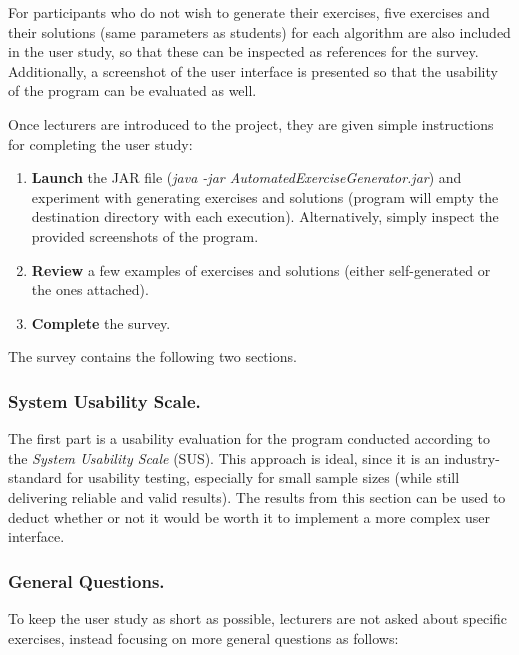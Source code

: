 \documentclass{l4proj}
\begin{document}
For participants who do not wish to generate their exercises, five exercises and their solutions (same parameters as students) for each algorithm are also included in the user study, so that these can be inspected as references for the survey. Additionally, a screenshot of the user interface is presented so that the usability of the program can be evaluated as well.

Once lecturers are introduced to the project, they are given simple instructions for completing the user study:
\begin{enumerate}
	\item
	\textbf{Launch} the JAR file (\emph{java -jar AutomatedExerciseGenerator.jar}) and experiment with generating exercises and solutions (program will empty the destination directory with each execution). Alternatively, simply inspect the provided screenshots of the program.
	\item
	\textbf{Review} a few examples of exercises and solutions (either self-generated or the ones attached).
	\item
	\textbf{Complete} the survey.
\end{enumerate}

The survey contains the following two sections.

\subsubsection{System Usability Scale.}

The first part is a usability evaluation for the program conducted according to the \emph{System Usability Scale} (SUS). This approach is ideal, since it is an industry-standard for usability testing, especially for small sample sizes (while still delivering reliable and valid results). The results from this section can be used to deduct whether or not it would be worth it to implement a more complex user interface.

\subsubsection{General Questions.}

To keep the user study as short as possible, lecturers are not asked about specific exercises, instead focusing on more general questions as follows:
\end{document}
